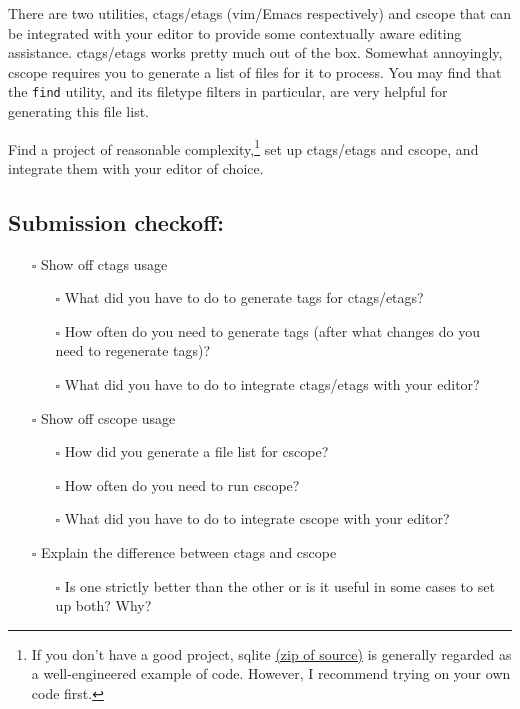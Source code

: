 \documentclass{article}
\begin{document}
There are two utilities, ctags/etags (vim/Emacs respectively) and cscope that
can be integrated with your editor to provide some contextually aware editing
assistance.
ctags/etags works pretty much out of the box. Somewhat annoyingly, cscope
requires you to generate a list of files for it to process. You may find that
the \texttt{find} utility, and its filetype filters in particular, are very
helpful for generating this file list.

Find a project of reasonable complexity,\footnote{
  If you don't have a good project, sqlite
  \href{https://www.sqlite.org/2016/sqlite-src-3100200.zip}{(zip of source)}
  is generally regarded as a well-engineered example of code. However, I
  recommend trying on your own code first.
} set up ctags/etags and cscope, and integrate them with your editor of
choice.

\subsection*{Submission checkoff:}
\begin{itemize}
  \item[$\square$] Show off ctags usage
    \begin{itemize}
      \item[$\square$] What did you have to do to generate tags for ctags/etags?
      \item[$\square$] How often do you need to generate tags (after what
        changes do you need to regenerate tags)?
      \item[$\square$] What did you have to do to integrate ctags/etags with
        your editor?
    \end{itemize}
  \item[$\square$] Show off cscope usage
    \begin{itemize}
      \item[$\square$] How did you generate a file list for cscope?
      \item[$\square$] How often do you need to run cscope?
      \item[$\square$] What did you have to do to integrate cscope with your
        editor?
    \end{itemize}
  \item[$\square$] Explain the difference between ctags and cscope
    \begin{itemize}
      \item[$\square$] Is one strictly better than the other or is it useful
        in some cases to set up both? Why?
    \end{itemize}
\end{itemize}
\end{document}
